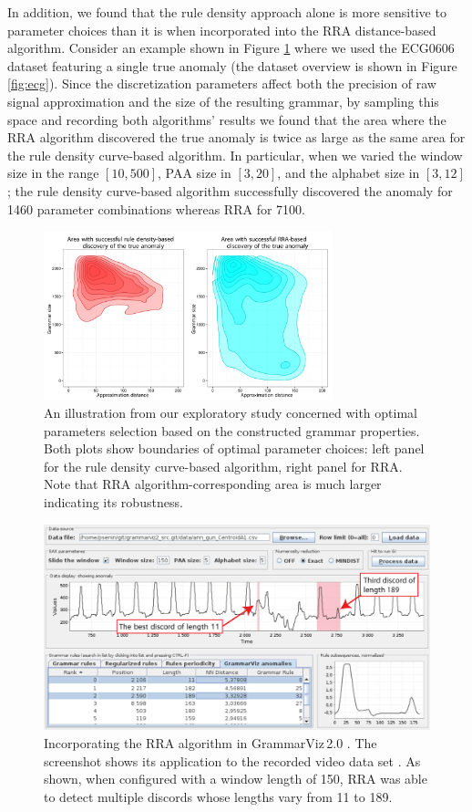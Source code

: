 \documentclass{sig-alternate}
\begin{document}
In addition, we found that the rule density approach alone is more sensitive to parameter choices than it is when incorporated into the RRA distance-based algorithm. Consider an example shown in Figure \ref{fig:area} where we used the ECG0606 dataset featuring a single true anomaly (the dataset overview is shown in Figure \ref{fig:ecg}). Since the discretization parameters affect both the precision of raw signal approximation and the size of the resulting grammar, by sampling this space and recording both algorithms' results we found that the area where the RRA algorithm discovered the true anomaly is twice as large as the same area for the rule density curve-based algorithm. In particular, when we varied the window size in the range $[10,500]$, PAA size in $[3,20]$, and the alphabet size in $[3,12]$; the rule density curve-based algorithm successfully discovered the anomaly for 1460 parameter combinations whereas RRA for 7100.

\begin{figure}[t]
   \centering
   \includegraphics[width=84mm]{ecg0606_areas.pdf}
   \caption{An illustration from our exploratory study concerned with optimal parameters selection based on the constructed grammar properties. Both plots show boundaries of optimal parameter choices: left panel for the rule density curve-based algorithm, right panel for RRA. Note that RRA algorithm-corresponding area is much larger indicating its robustness.}
   \label{fig:area}
\end{figure}

\begin{figure}[t]
   \centering
   \includegraphics[width=\textwidth]{VideoData2.pdf}
   \caption{Incorporating the RRA algorithm in GrammarViz\,2.0 \cite{grammarviz2}. The screenshot shows its application to the recorded video data set \cite{param_free}. As shown, when configured with a window length of 150, RRA was able to detect multiple discords whose lengths vary from 11 to 189.}
   \label{fig:app2}
\end{figure}
\end{document}
